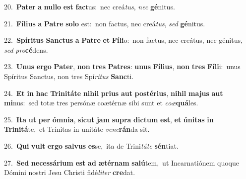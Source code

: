 {{\numbfont\textcolor{\numbcolor}{20.}}~\-\textbf{Pa}\-\textbf{ter} \textbf{a} \textbf{nul}\-\textbf{lo} \textbf{est} \textbf{fac}\-tus:~\star nec creá\-\textit{tus}\-, \textit{nec} \textbf{gé}\-nitus.\par
{\numbfont\textcolor{\numbcolor}{21.}}~\-\textbf{Fí}\-\textbf{li}\textbf{us} \textbf{a} \textbf{Pa}\-\textbf{tre} \textbf{so}\-\textbf{lo} est:~\star non factus, nec creá\-\textit{tus}\-, \textit{sed} \textbf{gé}\-nitus.\par
{\numbfont\textcolor{\numbcolor}{22.}}~\-\textbf{Spí}\-\textbf{ri}\textbf{tus} \textbf{Sanc}\-\textbf{tus} \textbf{a} \textbf{Pa}\-\textbf{tre} \textbf{et} \textbf{Fí}\-\textbf{li}o:~\star non factus, nec creátus, nec génitus, \textit{sed} \textit{pro}\-\textbf{cé}dens.\par
{\numbfont\textcolor{\numbcolor}{23.}}~\-\textbf{U}\-\textbf{nus} \textbf{er}\-\textbf{go} \textbf{Pa}\-\textbf{ter}, \textbf{non} \textbf{tres} \textbf{Pa}\-\textbf{tres}: \textbf{u}\-\textbf{nus} \textbf{Fí}\-\textbf{li}\textbf{us}, \textbf{non} \textbf{tres} \textbf{Fí}\-\textbf{li}i:~\star unus Spíritus Sanctus, non tres Spí\-\textit{ri}\-\textit{tus} \textbf{Sanc}\-ti.\par
{\numbfont\textcolor{\numbcolor}{24.}}~\textbf{Et} \textbf{in} \textbf{hac} \textbf{Tri}\-\textbf{ni}\textbf{tá}\textbf{te} \textbf{ni}\-\textbf{hil} \textbf{pri}\-\textbf{us} \textbf{aut} \textbf{post}\-\textbf{é}\textbf{ri}\textbf{us}, \textbf{ni}\-\textbf{hil} \textbf{ma}\-\textbf{jus} \textbf{aut} \textbf{mi}\-nus:~\star sed totæ tres persónæ coætérnæ sibi sunt et \textit{co}\-\textit{æ}\textbf{quá}les.\par
{\numbfont\textcolor{\numbcolor}{25.}}~\-\textbf{I}\-\textbf{ta} \textbf{ut} \textbf{per} \textbf{óm}\-\textbf{ni}\textbf{a}, \textbf{sic}\-\textbf{ut} \textbf{jam} \textbf{su}\-\textbf{pra} \textbf{dic}\-\textbf{tum} \textbf{est}\-, \textbf{et} \textbf{ú}\-\textbf{ni}\textbf{tas} \textbf{in} \textbf{Tri}\-\textbf{ni}\textbf{tá}te,~\star et Trínitas in unitáte \textit{ve}\-\textit{ne}\textbf{rán}da sit.\par
{\numbfont\textcolor{\numbcolor}{26.}}~\textbf{Qui} \textbf{vult} \textbf{er}\-\textbf{go} \textbf{sal}\-\textbf{vus} \textbf{es}\-se,~\star ita de Trini\-\textit{tá}\-\textit{te} \textbf{sén}\-tiat.\par
{\numbfont\textcolor{\numbcolor}{27.}}~\textbf{Sed} \textbf{ne}\-\textbf{ces}\textbf{sá}\textbf{ri}\textbf{um} \textbf{est} \textbf{ad} \textbf{æ}\-\textbf{tér}\textbf{nam} \textbf{sa}\-\textbf{lú}tem,~\star ut Incarnatiónem quoque Dómini nostri Jesu Christi fidé\-\textit{li}\-\textit{ter} \textbf{cre}\-dat.\par
}
